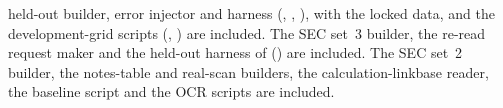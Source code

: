 held-out builder, error injector and harness (, , ), with the locked data, and the development-grid scripts (, ) are included. The SEC set~3 builder, the re-read request maker and the held-out harness of  () are included. The SEC set~2 builder, the notes-table and real-scan builders, the calculation-linkbase reader, the baseline script and the OCR scripts are included.
